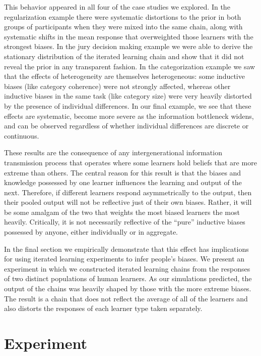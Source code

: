 \documentclass[doc]{apa6}
\begin{document}
This behavior appeared in all four of the case studies we explored. In the regularization example there were systematic distortions to the prior in both groups of participants when they were mixed into the same chain, along with systematic shifts in the mean response that overweighted those learners with the strongest biases. In the jury decision making example we were able to derive the stationary distribution of the iterated learning chain and show that it did not reveal the prior in any transparent fashion. In the categorization example we saw that the effects of heterogeneity are themselves heterogeneous: some inductive biases (like category coherence) were not strongly affected, whereas other inductive biases in the same task (like category size) were very heavily distorted by the presence of individual differences. In our final example, we see that these effects are systematic, become more severe as the information bottleneck widens, and can be observed regardless of whether individual differences are discrete or continuous.

These results are the consequence of any intergenerational information transmission process that operates where some learners hold beliefs that are more extreme than others. The central reason for this result is that the biases and knowledge possessed by one learner influences the learning and output of the next. Therefore, if different learners respond asymmetrically to the output, then their pooled output will not be reflective just of their own biases. Rather, it will be some amalgam of the two that weights the most biased learners the most heavily. Critically, it is not necessarily reflective of the ``pure'' inductive biases possessed by anyone, either individually or in aggregate.

In the final section we empirically demonstrate that this effect has implications for using iterated learning experiments to infer people's biases. We present an experiment in which we constructed iterated learning chains from the responses of two distinct populations of human learners. As our simulations predicted, the output of the chains was heavily shaped by those with the more extreme biases. The result is a chain that does not reflect the average of all of the learners and also distorts the responses of each learner type taken separately.


\section{Experiment}
\end{document}
